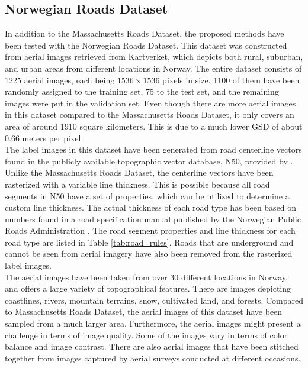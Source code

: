 
\subsection{Norwegian Roads Dataset}
In addition to the Massachusetts Roads Dataset, the proposed methods have been tested with the Norwegian Roads Dataset. This dataset was constructed from aerial images retrieved from Kartverket, which depicts both rural, suburban, and urban areas from different locations in Norway. The entire dataset consists of 1225 aerial images, each being $1536\times 1536$ pixels in size. 1100 of them have been randomly assigned to the training set, 75 to the test set, and the remaining images were put in the validation set. Even though there are more aerial images in this dataset compared to the Massachusetts Roads Dataset, it only covers an area of around 1910 square kilometers. This is due to a much lower \ac{GSD} of about 0.66 meters per pixel. \\


The label images in this dataset have been generated from road centerline vectors found in the publicly available topographic vector database, N50, provided by \cite{Kartverket}. Unlike the Massachusetts Roads Dataset, the centerline vectors have been rasterized with a variable line thickness. This is possible because all road segments in N50 have a set of properties, which can be utilized to determine a custom line thickness. The actual thickness of each road type has been based on numbers found in a road specification manual published by the Norwegian Public Roads Administration \citep{Norwegian_road_manual}. The road segment properties and line thickness for each road type are listed in Table \ref{tab:road_rules}. Roads that are underground and cannot be seen from aerial imagery have also been removed from the rasterized label images.\\

The aerial images have been taken from over 30 different locations in Norway, and offers a large variety of topographical features. There are images depicting coastlines, rivers, mountain terrains, snow, cultivated land, and forests. Compared to Massachusetts Roads Dataset, the aerial images of this dataset have been sampled from a much larger area. Furthermore, the aerial images might present a challenge in terms of image quality. Some of the images vary in terms of color balance and image contrast. There are also aerial images that have been stitched together from images captured by aerial surveys conducted at different occasions.\\

